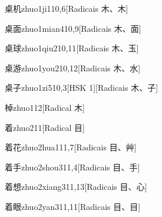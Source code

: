 \begin{entry}{桌机}{zhuo1ji1}{10,6}[Radicais ⽊、⽊]
\end{entry}

\begin{entry}{桌面}{zhuo1mian4}{10,9}[Radicais ⽊、⾯]
\end{entry}

\begin{entry}{桌球}{zhuo1qiu2}{10,11}[Radicais ⽊、⽟]
\end{entry}

\begin{entry}{桌游}{zhuo1you2}{10,12}[Radicais ⽊、⽔]
\end{entry}

\begin{entry}{桌子}{zhuo1zi5}{10,3}[HSK 1][Radicais ⽊、⼦]
\end{entry}

\begin{entry}{棹}{zhuo1}{12}[Radical ⽊]
\end{entry}

\begin{entry}{着}{zhuo2}{11}[Radical ⽬]
\end{entry}

\begin{entry}{着花}{zhuo2hua1}{11,7}[Radicais ⽬、⾋]
\end{entry}

\begin{entry}{着手}{zhuo2shou3}{11,4}[Radicais ⽬、⼿]
\end{entry}

\begin{entry}{着想}{zhuo2xiang3}{11,13}[Radicais ⽬、⼼]
\end{entry}

\begin{entry}{着眼}{zhuo2yan3}{11,11}[Radicais ⽬、⽬]
\end{entry}

